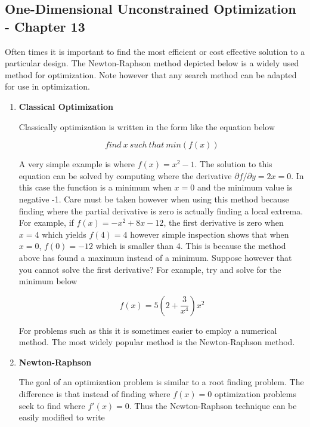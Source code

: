 \subsection{One-Dimensional Unconstrained Optimization - Chapter 13}

Often times it is important to find the most efficient or cost
effective solution to a particular design. The Newton-Raphson method
depicted below is a widely used method for optimization. Note however
that any search method can be adapted for use in optimization. 

\begin{enumerate}

\item {\bf Classical Optimization}

Classically optimization is written in the form like the equation
below

\begin{equation}
find~x~such~that~min(f(x))
\end{equation}

A very simple example is where $f(x) = x^2-1$. The solution to this
equation can be solved by computing where the derivative $\partial
f/\partial y = 2x = 0$. In this case the function is a minimum when
$x=0$ and the minimum value is negative -1. Care must be taken however
when using this method because finding where the partial derivative is
zero is actually finding a local extrema. For example, if $f(x) = -x^2
+ 8x -12$, the first derivative is zero when $x = 4$ which yields
$f(4) = 4$ however simple inspection shows that when $x=0$, $f(0)=-12$
which is smaller than 4. This is because the method above has found a
maximum instead of a minimum. Suppose however that you cannot solve
the first derivative? For example, try and solve for the minimum
below

\begin{equation}
f(x) = 5(2+\frac{3}{x^4})x^2
\end{equation}

For problems such as this it is sometimes easier to employ a numerical
method. The most widely popular method is the Newton-Raphson method.

\item{\bf Newton-Raphson}

The goal of an optimization problem is similar to a root finding
problem. The difference is that instead of finding where $f(x)=0$
optimization problems seek to find where $f'(x)=0$. Thus the
Newton-Raphson technique can be easily modified to write


\end{enumerate}

